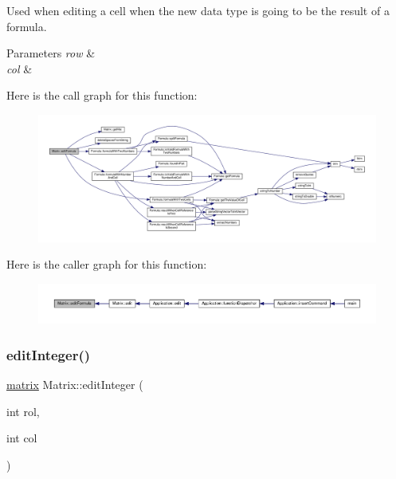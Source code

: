 Used when editing a cell when the new data type is going to be the result of a formula. 
\begin{DoxyParams}{Parameters}
{\em row} & \\
\hline
{\em col} & \\
\hline
\end{DoxyParams}
Here is the call graph for this function\+:
\nopagebreak
\begin{figure}[H]
\begin{center}
\leavevmode
\includegraphics[width=350pt]{class_matrix_af3d26e46fcec1a98380b1af04f008f22_cgraph}
\end{center}
\end{figure}
Here is the caller graph for this function\+:
\nopagebreak
\begin{figure}[H]
\begin{center}
\leavevmode
\includegraphics[width=350pt]{class_matrix_af3d26e46fcec1a98380b1af04f008f22_icgraph}
\end{center}
\end{figure}
\mbox{\label{class_matrix_a91c66e2961a16adf56b8d58b916d2d46}} 
\subsubsection{\texorpdfstring{edit\+Integer()}{editInteger()}}
{\footnotesize\ttfamily \hyperlink{formula_8h_a869e2a5deeb3daa4c82d6bc91cf20d92}{matrix} Matrix\+::edit\+Integer (\begin{DoxyParamCaption}\item[{int}]{rol,  }\item[{int}]{col }\end{DoxyParamCaption})\hspace{0.3cm}{\ttfamily [private]}}

